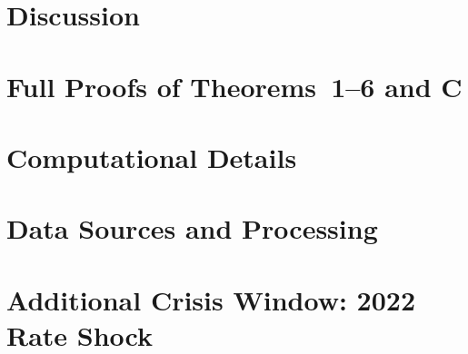 \documentclass[11pt]{article}
\theoremstyle{definition}
\begin{document}

\section{Discussion}
\label{sec:discussion}


\begin{appendices}

\section{Full Proofs of Theorems~1--6 and C}
\label{app:proofs}


\section{Computational Details}
\label{app:compute}


\section{Data Sources and Processing}
\label{app:data}


\section{Additional Crisis Window: 2022 Rate Shock}
\label{app:2022}


\end{appendices}
\end{document}
